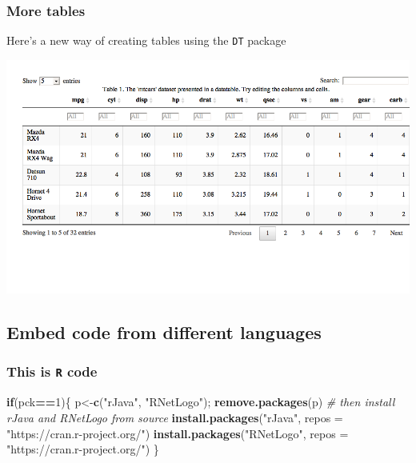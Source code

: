 \documentclass[article]{article}
\newenvironment{Shaded}{\begin{snugshade}}{\end{snugshade}}
\newcommand{\KeywordTok}[1]{\textcolor[rgb]{0.13,0.29,0.53}{\textbf{#1}}}
\newcommand{\DataTypeTok}[1]{\textcolor[rgb]{0.13,0.29,0.53}{#1}}
\newcommand{\DecValTok}[1]{\textcolor[rgb]{0.00,0.00,0.81}{#1}}
\newcommand{\StringTok}[1]{\textcolor[rgb]{0.31,0.60,0.02}{#1}}
\newcommand{\CommentTok}[1]{\textcolor[rgb]{0.56,0.35,0.01}{\textit{#1}}}
\newcommand{\ControlFlowTok}[1]{\textcolor[rgb]{0.13,0.29,0.53}{\textbf{#1}}}
\newcommand{\OperatorTok}[1]{\textcolor[rgb]{0.81,0.36,0.00}{\textbf{#1}}}
\newcommand{\NormalTok}[1]{#1}
\begin{document}
\subsubsection{More tables}\label{more-tables}

Here's a new way of creating tables using the \texttt{DT} package

\includegraphics{Lesson5_rmd_files/figure-docx/unnamed-chunk-5-1.png}

\subsection{Embed code from different
languages}\label{embed-code-from-different-languages}

\subsubsection{\texorpdfstring{This is \texttt{R}
code}{This is R code}}\label{this-is-r-code}

\begin{Shaded}
\begin{Highlighting}[]
\ControlFlowTok{if}\NormalTok{(pck}\OperatorTok{==}\DecValTok{1}\NormalTok{)\{}
\NormalTok{  p<-}\KeywordTok{c}\NormalTok{(}\StringTok{"rJava"}\NormalTok{, }\StringTok{"RNetLogo"}\NormalTok{); }\KeywordTok{remove.packages}\NormalTok{(p)}
  \CommentTok{# then install rJava and RNetLogo from source}
  \KeywordTok{install.packages}\NormalTok{(}\StringTok{"rJava"}\NormalTok{, }\DataTypeTok{repos =} \StringTok{"https://cran.r-project.org/"}\NormalTok{)}
  \KeywordTok{install.packages}\NormalTok{(}\StringTok{"RNetLogo"}\NormalTok{, }\DataTypeTok{repos =} \StringTok{"https://cran.r-project.org/"}\NormalTok{)}
\NormalTok{\}}
\end{Highlighting}
\end{Shaded}
\end{document}
